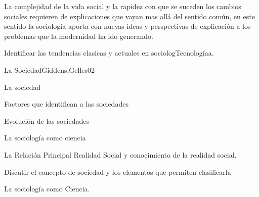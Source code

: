 \begin{syllabus}


\begin{justification}
La complejidad de la vida social y la rapidez con que se suceden los cambios sociales requieren 
de explicaciones que vayan mas allá del sentido común, en este sentido la sociología 
aporta con nuevas ideas y perspectivas de explicación a los problemas que la modernidad 
ha ido generando.
\end{justification}

\begin{goals}
\item Identificar las tendencias clasicas y actuales en sociologTecnologíaa.
\end{goals}

\begin{outcomes}
\end{outcomes}

\begin{unit}{La Sociedad}{Giddens,Gelles}{0}{2}
    \begin{topics}
      \item La sociedad
      \item Factores que identifican a las sociedades
      \item Evolución de las sociedades
      \item La sociología como ciencia
      \item La Relación Principal Realidad Social y conocimiento de la realidad social.
    \end{topics}
    \begin{learningoutcomes}
      \item Discutir el concepto de sociedad y los elementos que permiten clasificarla
      \item La sociología como Ciencia.
    \end{learningoutcomes}
\end{unit}


\end{syllabus}
